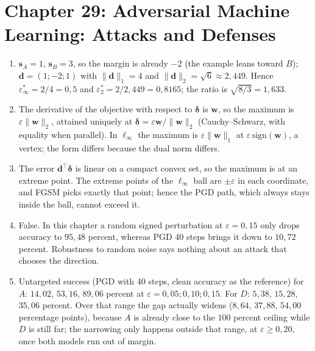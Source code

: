 \section*{Chapter 29: Adversarial Machine Learning: Attacks and Defenses}
\begin{enumerate}[label=\textbf{29.\arabic*}]
  \item $\mathbf{s}_{A}=1$, $\mathbf{s}_{B}=3$, so the margin is already $-2$ (the example
        leans toward $B$); $\mathbf{d}=(1;-2;1)$ with $\lVert\mathbf{d}\rVert_{1}=4$
        and $\lVert\mathbf{d}\rVert_{2}=\sqrt6\approx2{,}449$. Hence
        $\varepsilon^{*}_{\infty}=2/4=0{,}5$ and
        $\varepsilon^{*}_{2}=2/2{,}449=0{,}8165$; the ratio is $\sqrt{8/3}=1{,}633$.

  \item The derivative of the objective with respect to $\boldsymbol{\delta}$ is $\mathbf{w}$, so
        the maximum is $\varepsilon\lVert\mathbf{w}\rVert_{2}$, attained uniquely at
        $\boldsymbol{\delta}=\varepsilon\mathbf{w}/\lVert\mathbf{w}\rVert_{2}$
        (Cauchy--Schwarz, with equality when parallel). In
        $\ell_\infty$ the maximum is $\varepsilon\lVert\mathbf{w}\rVert_{1}$ at
        $\varepsilon\,\mathrm{sign}(\mathbf{w})$, a vertex; the form differs
        because the dual norm differs.

  \item The error $\mathbf{d}^{\top}\boldsymbol{\delta}$ is linear on a compact convex
        set, so the maximum is at an extreme point. The extreme points of the
        $\ell_\infty$ ball are $\pm\varepsilon$ in each coordinate, and FGSM picks
        exactly that point; hence the PGD path, which always stays inside the ball,
        cannot exceed it.

  \item False. In this chapter a random signed perturbation at $\varepsilon=0{,}15$ only
        drops accuracy to $95{,}48$ percent, whereas PGD 40 steps
        brings it down to $10{,}72$ percent. Robustness to random noise
        says nothing about an attack that chooses the direction.

  \item 
Untargeted success (PGD with 40 steps, clean accuracy as the reference) for
        $A$: $14{,}02$, $53{,}16$, $89{,}06$ percent at $\varepsilon=
        0{,}05;0{,}10;0{,}15$. For $D$: $5{,}38$, $15{,}28$, $35{,}06$ percent. Over
        that range the gap actually widens ($8{,}64$, $37{,}88$, $54{,}00$
        percentage points), because $A$ is already close to the $100$ percent
        ceiling while $D$ is still far; the narrowing only happens outside that
        range, at $\varepsilon\ge0{,}20$, once both models run out of margin.


\end{enumerate}
